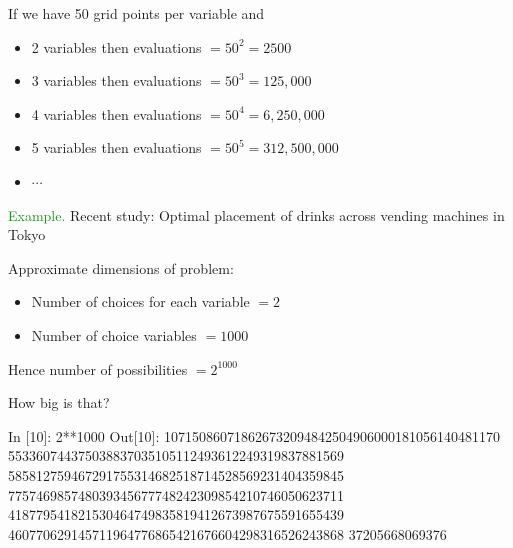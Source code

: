 \documentclass[
    xcolor={svgnames,dvipsnames},
    hyperref={colorlinks, citecolor=DeepPink4, linkcolor=DarkRed, urlcolor=DarkBlue}
    ]{beamer}  %
\newcommand{\Eg}{\textcolor{ForestGreen}{Example. }}
\newcommand{\1}{\mathbbm 1}
\begin{document}
\begin{frame}
    

    If we have 50 grid points per variable and 
    
    \begin{itemize}
        \item 2 variables then evaluations $=50^2 = 2500$
        \vspace{0.5em}
        \item 3 variables then evaluations $=50^3 = 125,000$
        \vspace{0.5em}
        \item 4 variables then evaluations $=50^4 = 6,250,000$
        \vspace{0.5em}
        \item 5 variables then evaluations $=50^5 = 312,500,000$
        \vspace{0.5em}
        \item $\cdots$
    \end{itemize}

\end{frame}



\begin{frame}
    
    \Eg Recent study: Optimal placement of drinks across vending machines in
    Tokyo

        \vspace{0.5em}
        \vspace{0.5em}
    Approximate dimensions of problem:

    \begin{itemize}
        \item Number of choices for each variable $=2$
        \vspace{0.5em}
        \item Number of choice variables $=1000$
    \end{itemize}

        \vspace{0.5em}
        \vspace{0.5em}
    Hence number of possibilities $=2^{1000}$

    \vspace{1em}

    How big is that?

\end{frame}

\begin{frame}[fragile]
    
\begin{pythoncode}
In [10]: 2**1000
Out[10]:
107150860718626732094842504906000181056140481170
553360744375038837035105112493612249319837881569
585812759467291755314682518714528569231404359845
775746985748039345677748242309854210746050623711
418779541821530464749835819412673987675591655439
460770629145711964776865421676604298316526243868
37205668069376
\end{pythoncode}

\end{frame}
\end{document}
